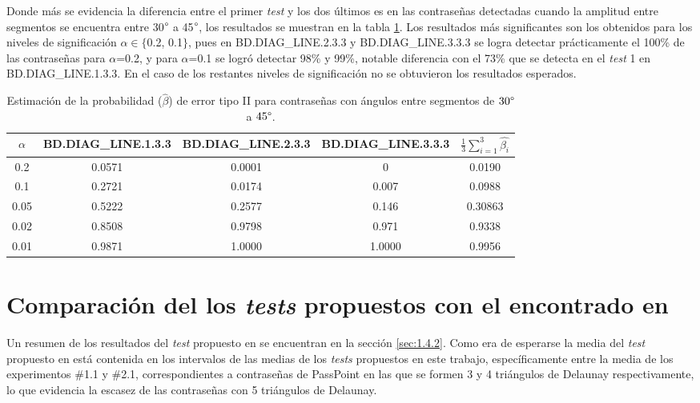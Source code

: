 \documentclass[12pt]{report}
\begin{document}
Donde más se evidencia la diferencia entre  el primer \textit{test} y los dos últimos es en las contraseñas detectadas cuando la amplitud entre segmentos se encuentra entre 30$\degree$ a 45$\degree$, los resultados se muestran en la tabla \ref{tab:error2-30-45}. Los resultados más significantes son los obtenidos para los niveles de significación $\alpha \in \{$0.2, 0.1$\}$, pues en   BD.DIAG\_LINE.2.3.3 y BD.DIAG\_LINE.3.3.3  se logra detectar prácticamente el 100\% de las contraseñas para $\alpha$=0.2, y para $\alpha$=0.1 se logró detectar 98\% y 99\%, notable diferencia con el 73\% que se detecta en el \textit{test} 1 en BD.DIAG\_LINE.1.3.3. En el caso de los restantes niveles de significación no se obtuvieron los resultados esperados.
\begin{table}[h!]
	\centering
	\begin{tabular}{|c|ccc|c|}
		\hline
		$\alpha$& BD.DIAG\_LINE.1.3.3 & BD.DIAG\_LINE.2.3.3 & BD.DIAG\_LINE.3.3.3 &$\frac{1}{3} \sum_{i=1}^{3} \hat{\beta_i}$ \\
		\hline
		0.2 & 0.0571     & 0.0001     & 0        &   0.0190   \\
		0.1 & 0.2721      & 0.0174    & 0.007    &  0.0988  \\
		0.05& 0.5222    & 0.2577     & 0.146     &  0.30863  \\
		0.02& 0.8508     & 0.9798    & 0.971     &   0.9338  \\
		0.01& 0.9871     & 1.0000     & 1.0000   &   0.9956  \\
		\hline
	\end{tabular}
	\caption{Estimación de la probabilidad ($\hat{\beta}$) de error tipo II para contraseñas con ángulos entre segmentos de $30\degree$ a $45\degree$.}
	\label{tab:error2-30-45}
\end{table}


\section{Comparación del los \textit{tests} propuestos con el encontrado en  \cite{13}}
Un resumen de los resultados del \textit{test} propuesto en \cite{13} se encuentran en la sección \ref{sec:1.4.2}. Como era de esperarse la media del \textit{test} propuesto en \cite{13} está contenida en los intervalos de las medias de los \textit{tests} propuestos en este trabajo, específicamente entre la media de los experimentos \#1.1 y \#2.1, correspondientes a contraseñas de PassPoint en las que se formen 3 y 4 triángulos de Delaunay respectivamente, lo que evidencia la escasez de las contraseñas con 5 triángulos de Delaunay.
\end{document}
